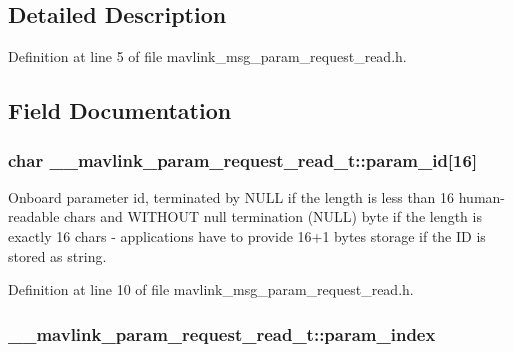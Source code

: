 \subsection{Detailed Description}


Definition at line 5 of file mavlink\-\_\-msg\-\_\-param\-\_\-request\-\_\-read.\-h.



\subsection{Field Documentation}
\hypertarget{struct____mavlink__param__request__read__t_aa8ffcf4369a38e0a04cc0252ec13b54e}{
\subsubsection[{param\-\_\-id}]{\setlength{\rightskip}{0pt plus 5cm}char \-\_\-\-\_\-mavlink\-\_\-param\-\_\-request\-\_\-read\-\_\-t\-::param\-\_\-id\mbox{[}16\mbox{]}}}\label{struct____mavlink__param__request__read__t_aa8ffcf4369a38e0a04cc0252ec13b54e}


Onboard parameter id, terminated by N\-U\-L\-L if the length is less than 16 human-\/readable chars and W\-I\-T\-H\-O\-U\-T null termination (N\-U\-L\-L) byte if the length is exactly 16 chars -\/ applications have to provide 16+1 bytes storage if the I\-D is stored as string. 



Definition at line 10 of file mavlink\-\_\-msg\-\_\-param\-\_\-request\-\_\-read.\-h.

\hypertarget{struct____mavlink__param__request__read__t_aef0bfa3c1d8457e0b417fa87b31f3c22}{
\subsubsection[{param\-\_\-index}]{ \-\_\-\-\_\-mavlink\-\_\-param\-\_\-request\-\_\-read\-\_\-t\-::param\-\_\-index}}\label{struct____mavlink__param__request__read__t_aef0bfa3c1d8457e0b417fa87b31f3c22}


